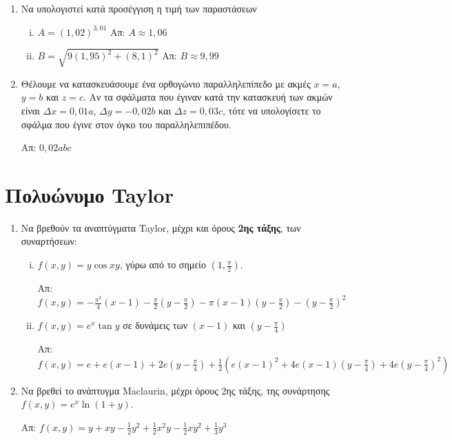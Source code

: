 \begin{enumerate}
    \item Να υπολογιστεί κατά προσέγγιση η τιμή των παραστάσεων
        \begin{enumerate}[i)]
            \item $A = (1,02)^{3,01} $ \hfill Απ: $ A \approx 1,06 $ 
            \item $B =  \sqrt{ 9(1,95)^{2} + (8,1)^{2} } $ 
                \hfill Απ: $ B \approx 9,99 $ 
        \end{enumerate}

    \item Θέλουμε να κατασκευάσουμε ένα ορθογώνιο παραλληλεπίπεδο με ακμές $ x = a $, 
        $ y=b $ και $ z=c $. Αν τα σφάλματα που έγιναν κατά την κατασκευή των ακμών 
        είναι $ \Delta x = 0,01a $, $ \Delta y = -0,02b $ και $ \Delta z = 0,03c $, 
        τότε να υπολογίσετε το σφάλμα που έγινε στον όγκο του παραλληλεπιπέδου.

        \hfill Απ: $ 0,02abc $ 
\end{enumerate}


        \section{Πολυώνυμο Taylor}

        \begin{enumerate}
            \item Να βρεθούν τα αναπτύγματα Taylor, μέχρι και όρους 
                \textbf{2ης τάξης}, των συναρτήσεων:

                \begin{enumerate}[i)]
                    \item  $f(x,y)=y\cos{xy} $, γύρω από το σημείο 
                        $ \left(1, \frac{ \pi }{ 2 }\right) $.

                        \hfill Απ: $f(x,y)=-\frac{\pi^{2}}{4}(x-1) - \frac{ \pi }{ 2 } 
                        \left(y - \frac{ \pi }{2 }\right) - \pi(x-1)
                        \left(y-\frac{\pi}{2}\right)- \left(y- \frac{ \pi }{ 2} \right)^{2} $

                    \item $ f(x,y)=e^{x}\tan{y} $ σε δυνάμεις των $ (x-1) $ και 
                        $ \left(y - \frac{ \pi }{ 4 }\right) $

                        \hfill Απ: $ f(x,y) = e + e(x-1) + 2e\left(y- \frac{ \pi }{ 4 }\right)
                        + \frac{1}{ 2 } \left(e(x-1)^{2}+4e(x-1)\left(y- \frac{ \pi }{ 4 }
                        \right) + 4e\left(y- \frac{ \pi }{ 4 } \right)^{2}\right) $
                \end{enumerate}

            \item Να βρεθεί το ανάπτυγμα Maclaurin, μέχρι όρους 2ης τάξης, 
                της συνάρτησης $ f(x,y) = e^{x}\ln(1+y)$.

                \hfill Απ: $ f(x,y)=y + xy - \frac{1}{ 2 } y^{2} + \frac{1}{ 2 } x^{2}y - 
                \frac{1}{ 2 } xy^{2} + \frac{1}{ 3 } y^{3} $

        \end{enumerate}
    
